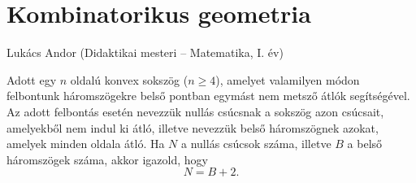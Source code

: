 
\chapter{Kombinatorikus geometria}\label{chap:kombgeo}
\begin{description}
{\large \item [{Szerző:}] Lukács Andor (Didaktikai mesteri -- Matematika, I. év)}
\end{description}
\begin{problem}
Adott egy $n$ oldalú konvex sokszög ($n\geq4$), amelyet valamilyen
módon felbontunk háromszögekre belső pontban egymást nem metsző átlók
segítségével. Az adott felbontás esetén nevezzük nullás csúcsnak a
sokszög azon csúcsait, amelyekből nem indul ki átló, illetve nevezzük
belső háromszögnek azokat, amelyek minden oldala átló. Ha $N$ a nullás
csúcsok száma, illetve $B$ a belső háromszögek száma, akkor igazold,
hogy 
\[
N=B+2.
\]
\end{problem}

